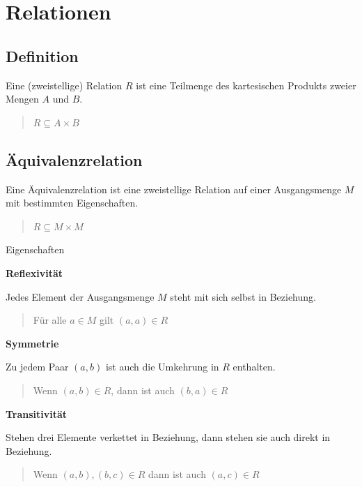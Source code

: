 \documentclass[german]{latex4ei/latex4ei_sheet}
\begin{document}
\section{Relationen}

\begin{sectionbox}

\subsection{Definition}
	Eine (zweistellige) Relation $R$ ist eine Teilmenge des kartesischen Produkts zweier Mengen $A$ und $B$.

	\begin{quote}
		$R \subseteq A\times B$
	\end{quote}

\subsection{Äquivalenzrelation}
	Eine Äquivalenzrelation ist eine zweistellige Relation auf einer Ausgangsmenge $M$ mit bestimmten Eigenschaften.

	\begin{quote}
		$R \subseteq M\times M$
	\end{quote}

	\begin{cookbox}{Eigenschaften}
		\item \textbf{Reflexivität}

		Jedes Element der Ausgangsmenge $M$ steht mit sich selbst in Beziehung.

		\begin{quote}
			Für alle $a \in M$ gilt $\left( a , a \right) \in R$
		\end{quote}

	\item \textbf{Symmetrie}

	Zu jedem Paar $\left( a , b \right)$ ist auch die Umkehrung in $R$ enthalten.

	\begin{quote}
		Wenn $\left( a , b \right) \in R$, dann ist auch $\left( b , a \right) \in R$
	\end{quote}

	\item \textbf{Transitivität}

	Stehen drei Elemente verkettet in Beziehung, dann stehen sie auch direkt in Beziehung.

	\begin{quote}
		Wenn $\left( a , b \right) , \left( b , c \right) \in R$ dann ist auch $\left(a , c \right) \in R$
	\end{quote}

	\end{cookbox}

\end{sectionbox}
\end{document}
